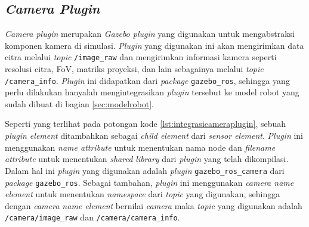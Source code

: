 \subsection{\emph{Camera Plugin}}
\label{subsec:cameraplugin}

\emph{Camera plugin} merupakan \emph{Gazebo plugin} yang digunakan untuk mengabstraksi komponen kamera di simulasi.
\emph{Plugin} yang digunakan ini akan mengirimkan data citra melalui \emph{topic} \lstinline{/image_raw} dan mengirimkan informasi kamera seperti resolusi citra, FoV, matriks proyeksi, dan lain sebagainya melalui \emph{topic} \lstinline{/camera_info}.
\emph{Plugin} ini didapatkan dari \emph{package} \lstinline{gazebo_ros},
  sehingga yang perlu dilakukan hanyalah mengintegrasikan \emph{plugin} tersebut ke model robot yang sudah dibuat di bagian \ref{sec:modelrobot}.



Seperti yang terlihat pada potongan kode \ref{lst:integrasicameraplugin},
  sebuah \emph{plugin element} ditambahkan sebagai \emph{child element} dari \emph{sensor element}.
\emph{Plugin} ini menggunakan \emph{name attribute} untuk menentukan nama node dan \emph{filename attribute} untuk menentukan \emph{shared library} dari \emph{plugin} yang telah dikompilasi.
Dalam hal ini \emph{plugin} yang digunakan adalah \emph{plugin} \lstinline{gazebo_ros_camera} dari \emph{package} \lstinline{gazebo_ros}.
Sebagai tambahan, \emph{plugin} ini menggunakan \emph{camera name element} untuk menentukan \emph{namespace} dari \emph{topic} yang digunakan,
  sehingga dengan \emph{camera name element} bernilai \emph{camera} maka \emph{topic} yang digunakan adalah \lstinline{/camera/image_raw} dan \lstinline{/camera/camera_info}.
